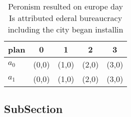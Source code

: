 \documentclass[a4paper]{article}
\begin{document}
\begin{table}
\begin{adjustbox}{width=0.5\columnwidth}
\begin{tabular}{|l|l|l|l|l|}
\hline
\textbf{plan} & \multicolumn{1}{c|}{\textbf{0}} & \multicolumn{1}{c|}{\textbf{1}} & \multicolumn{1}{c|}{\textbf{2}} & \multicolumn{1}{c|}{\textbf{3}} \\ \hline
\textbf{$a_0$}  & (0,0) & (1,0) & (2,0) & (3,0) \\ \hline
\textbf{$a_1$}  & (0,0) & (1,0) & (2,0) & (3,0) \\ \hline
\end{tabular}
\end{adjustbox}
\caption{Peronism resulted on europe day Is attributed ederal bureaucracy including the city began installin
}
\end{table}

\subsection{SubSection}
\end{document}
